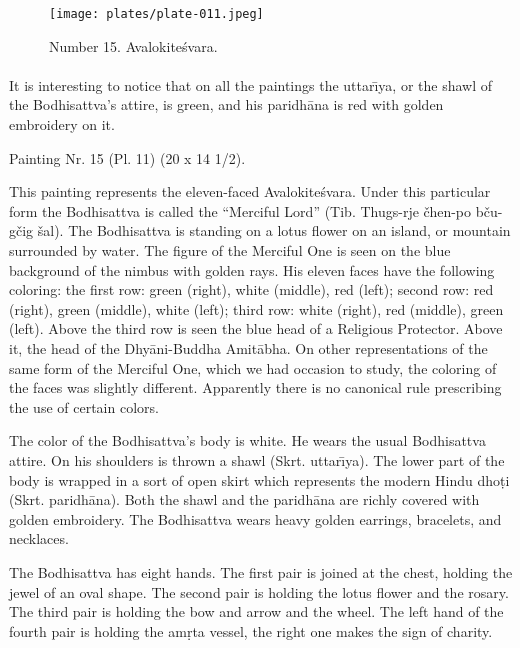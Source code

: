 \documentclass[a4paper, 12pt, oneside]{article}
\begin{document}
\clearpage
\vspace*{\fill}
\begin{figure}[H]
\centering
\texttt{[image: plates/plate-011.jpeg]}
\caption*{Number 15. Avalokite\'{s}vara.}
\end{figure}
\vspace*{\fill}
\clearpage
\paragraph{}
It is interesting to notice that on all the paintings the uttar\={\i}ya, or the shawl of the Bodhisattva's attire, is green, and his paridh\={a}na is red with golden embroidery on it.

\bigskip

Painting Nr. 15 (Pl. 11) (20 x 14 1/2).

\bigskip

This painting represents the eleven-faced Avalokite\'{s}vara. Under this particular form the Bodhisattva is called the ``Merciful Lord'' (Tib. Thugs-rje čhen-po bču-gčig šal). The Bodhisattva is standing on a lotus flower on an island, or mountain surrounded by water. The figure of the Merciful One is seen on the blue background of the nimbus with golden rays. His eleven faces have the following coloring: the first row: green (right), white (middle), red (left); second row: red (right), green (middle), white (left); third row: white (right), red (middle), green (left). Above the third row is seen the blue head of a Religious Protector. Above it, the head of the Dhy\={a}ni-Buddha Amit\={a}bha. On other representations of the same form of the Merciful One, which we had occasion to study, the coloring of the faces was slightly different. Apparently there is no canonical rule prescribing the use of certain colors.

The color of the Bodhisattva's body is white. He wears the usual Bodhisattva attire. On his shoulders is thrown a shawl (Skrt. uttar\={\i}ya). The lower part of the body is wrapped in a sort of open skirt which represents the modern Hindu dho\d{t}i (Skrt. paridh\={a}na). Both the shawl and the paridh\={a}na are richly covered with golden embroidery. The Bodhisattva wears heavy golden earrings, bracelets, and necklaces.

The Bodhisattva has eight hands. The first pair is joined at the chest, holding the jewel of an oval shape. The second pair is holding the lotus flower and the rosary. The third pair is holding the bow and arrow and the wheel. The left hand of the fourth pair is holding the am\d{r}ta vessel, the right one makes the sign of charity.
\end{document}
